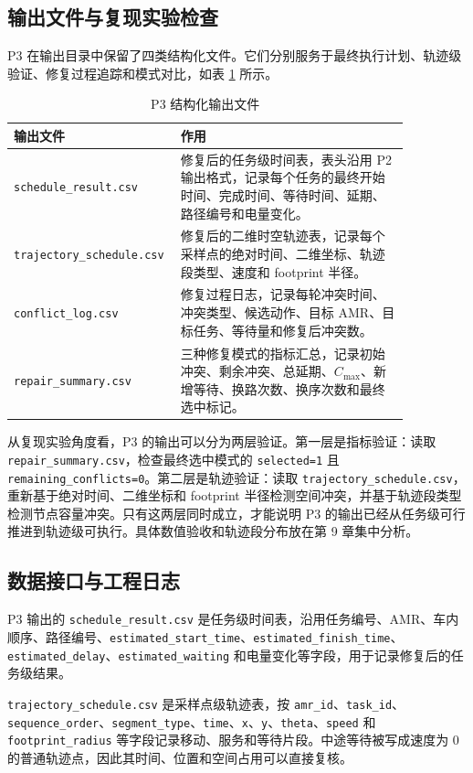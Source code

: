 \subsection{输出文件与复现实验检查}

P3 在输出目录中保留了四类结构化文件。它们分别服务于最终执行计划、轨迹级验证、修复过程追踪和模式对比，如表 \ref{tab:p3-output-files} 所示。

\begin{table}[H]
\centering
\small
\begin{tabular}{p{0.30\linewidth}p{0.56\linewidth}}
\toprule
输出文件 & 作用 \\
\midrule
\texttt{schedule\_result.csv} & 修复后的任务级时间表，表头沿用 P2 输出格式，记录每个任务的最终开始时间、完成时间、等待时间、延期、路径编号和电量变化。 \\
\texttt{trajectory\_schedule.csv} & 修复后的二维时空轨迹表，记录每个采样点的绝对时间、二维坐标、轨迹段类型、速度和 footprint 半径。 \\
\texttt{conflict\_log.csv} & 修复过程日志，记录每轮冲突时间、冲突类型、候选动作、目标 AMR、目标任务、等待量和修复后冲突数。 \\
\texttt{repair\_summary.csv} & 三种修复模式的指标汇总，记录初始冲突、剩余冲突、总延期、$C_{\max}$、新增等待、换路次数、换序次数和最终选中标记。 \\
\bottomrule
\end{tabular}
\caption{P3 结构化输出文件}
\label{tab:p3-output-files}
\end{table}

从复现实验角度看，P3 的输出可以分为两层验证。第一层是指标验证：读取 \verb|repair_summary.csv|，检查最终选中模式的 \verb|selected=1| 且 \verb|remaining_conflicts=0|。第二层是轨迹验证：读取 \verb|trajectory_schedule.csv|，重新基于绝对时间、二维坐标和 footprint 半径检测空间冲突，并基于轨迹段类型检测节点容量冲突。只有这两层同时成立，才能说明 P3 的输出已经从任务级可行推进到轨迹级可执行。具体数值验收和轨迹段分布放在第 9 章集中分析。

\subsection{数据接口与工程日志}

P3 输出的 \verb|schedule_result.csv| 是任务级时间表，沿用任务编号、AMR、车内顺序、路径编号、\verb|estimated_start_time|、\verb|estimated_finish_time|、\verb|estimated_delay|、\verb|estimated_waiting| 和电量变化等字段，用于记录修复后的任务级结果。

\verb|trajectory_schedule.csv| 是采样点级轨迹表，按 \verb|amr_id|、\verb|task_id|、\verb|sequence_order|、\verb|segment_type|、\verb|time|、\verb|x|、\verb|y|、\verb|theta|、\verb|speed| 和 \verb|footprint_radius| 等字段记录移动、服务和等待片段。中途等待被写成速度为 0 的普通轨迹点，因此其时间、位置和空间占用可以直接复核。

